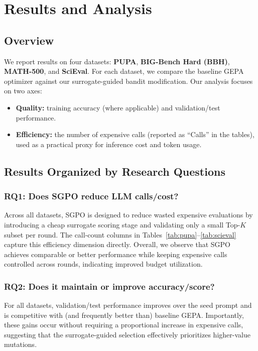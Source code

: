 \chapter{Results and Analysis}
\label{ch:results}

\section{Overview}
We report results on four datasets: \textbf{PUPA}, \textbf{BIG-Bench Hard (BBH)}, \textbf{MATH-500}, and \textbf{SciEval}. For each dataset, we compare the baseline GEPA optimizer against our surrogate-guided bandit modification. Our analysis focuses on two axes:
\begin{itemize}
    \item \textbf{Quality:} training accuracy (where applicable) and validation/test performance.
    \item \textbf{Efficiency:} the number of expensive calls (reported as ``Calls'' in the tables), used as a practical proxy for inference cost and token usage.
\end{itemize}

\section{Results Organized by Research Questions}

\subsection*{RQ1: Does SGPO reduce LLM calls/cost?}
Across all datasets, SGPO is designed to reduce wasted expensive evaluations by introducing a cheap surrogate scoring stage and validating only a small Top-$K$ subset per round. The call-count columns in Tables~\ref{tab:pupa}--\ref{tab:scieval} capture this efficiency dimension directly. Overall, we observe that SGPO achieves comparable or better performance while keeping expensive calls controlled across rounds, indicating improved budget utilization.

\subsection*{RQ2: Does it maintain or improve accuracy/score?}
For all datasets, validation/test performance improves over the seed prompt and is competitive with (and frequently better than) baseline GEPA. Importantly, these gains occur without requiring a proportional increase in expensive calls, suggesting that the surrogate-guided selection effectively prioritizes higher-value mutations.

